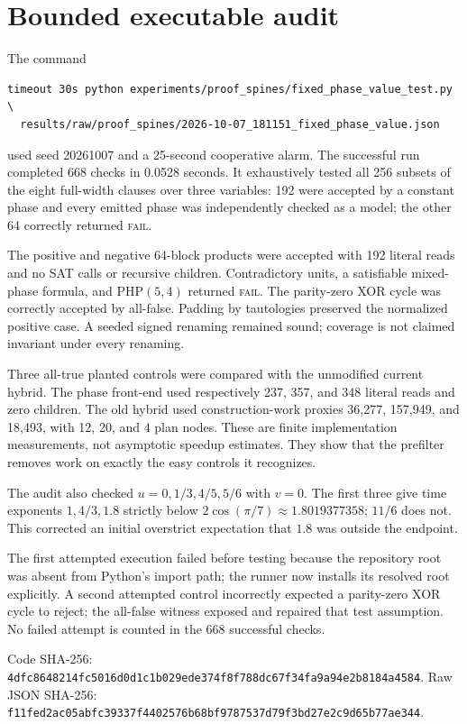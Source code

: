 \documentclass[11pt]{article}
\begin{document}
\section{Bounded executable audit}
The command
\begin{verbatim}
timeout 30s python experiments/proof_spines/fixed_phase_value_test.py \
  results/raw/proof_spines/2026-10-07_181151_fixed_phase_value.json
\end{verbatim}
used seed 20261007 and a 25-second cooperative alarm.  The successful run
completed 668 checks in 0.0528 seconds.  It exhaustively tested all 256
subsets of the eight full-width clauses over three variables: 192 were
accepted by a constant phase and every emitted phase was independently
checked as a model; the other 64 correctly returned \textsc{fail}.

The positive and negative 64-block products were accepted with 192 literal
reads and no SAT calls or recursive children.  Contradictory units, a
satisfiable mixed-phase formula, and PHP$(5,4)$ returned \textsc{fail}.  The
parity-zero XOR cycle was correctly accepted by all-false.  Padding by
tautologies preserved the normalized positive case.  A seeded signed
renaming remained sound; coverage is not claimed invariant under every
renaming.

Three all-true planted controls were compared with the unmodified current
hybrid.  The phase front-end used respectively 237, 357, and 348 literal
reads and zero children.  The old hybrid used construction-work proxies
36,277, 157,949, and 18,493, with 12, 20, and 4 plan nodes.  These are finite
implementation measurements, not asymptotic speedup estimates.  They show
that the prefilter removes work on exactly the easy controls it recognizes.

The audit also checked $u=0,1/3,4/5,5/6$ with $v=0$.  The first three give
time exponents $1,4/3,1.8$ strictly below
$2\cos(\pi/7)\approx1.8019377358$; $11/6$ does not.  This corrected an
initial overstrict expectation that $1.8$ was outside the endpoint.

The first attempted execution failed before testing because the repository
root was absent from Python's import path; the runner now installs its
resolved root explicitly.  A second attempted control incorrectly expected a
parity-zero XOR cycle to reject; the all-false witness exposed and repaired
that test assumption.  No failed attempt is counted in the 668 successful
checks.

Code SHA-256:
\texttt{4dfc8648214fc5016d0d1c1b029ede374f8f788dc67f34fa9a94e2b8184a4584}.
Raw JSON SHA-256:
\texttt{f11fed2ac05abfc39337f4402576b68bf9787537d79f3bd27e2c9d65b77ae344}.
\end{document}
